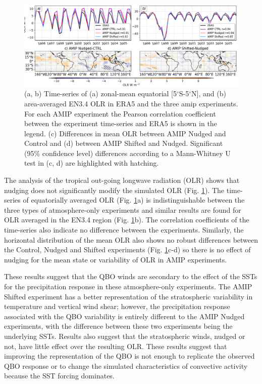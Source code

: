 \begin{figure}[t!]
\centering
 \includegraphics[width=\linewidth]{figures/olr_amip.png}
\caption[OLR time-series and spatial pattern differences in AMIP experiments]{(a, b) Time-series of (a) zonal-mean equatorial [5$^\circ$S-5$^\circ$N], and (b) area-averaged EN3.4 OLR in ERA5 and the three amip experiments. For each AMIP experiment the Pearson correlation coefficient between the experiment time-series and ERA5 is shown in the legend. (c) Differences in mean OLR between AMIP Nudged and Control and (d) between AMIP Shifted and Nudged. Significant (95\% confidence level) differences according to a Mann-Whitney U test in (c, d) are highlighted with hatching. }
\label{fig:olr_amip}
\end{figure}

The analysis of the tropical out-going longwave radiation (OLR) shows that nudging does not significantly modify the simulated OLR (Fig. \ref{fig:olr_amip}). 
The time-series of equatorially averaged OLR (Fig. \ref{fig:olr_amip}a) is indistinguishable between the three types of atmosphere-only experiments and similar results are found for OLR averaged in the EN3.4 region (Fig. \ref{fig:olr_amip}b). The correlation coefficients of the time-series also indicate no difference between the experiments. Similarly, the horizontal distribution of the mean OLR also shows no robust differences between the Control, Nudged and Shifted experiments (Fig. \ref{fig:olr_amip}c-d) so there is no effect of nudging for the mean state or variability of OLR in AMIP experiments.

These results suggest that the QBO winds are secondary to the effect of the SSTs for the precipitation response in these atmosphere-only experiments. The AMIP Shifted experiment has a better representation of the stratospheric variability in temperature and vertical wind shear; however, the precipitation response associated with the QBO variability is entirely different to the AMIP Nudged experiments, with the difference between these two experiments being the underlying SSTs. Results also suggest that the stratospheric winds, nudged or not, have little effect over the resulting OLR. These results suggest that improving the representation of the QBO is not enough to replicate the observed QBO response or to change the simulated characteristics of convective activity because the SST forcing dominates. 

